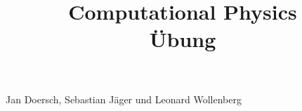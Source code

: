 \documentclass[a4paper, 12pt]{article}
\begin{document}
\title{
\textbf{Computational Physics\\
Übung}
}
\date{}
\maketitle

\begin{center}
Jan Doersch, Sebastian Jäger und Leonard Wollenberg
\end{center}
%




\end{document}
